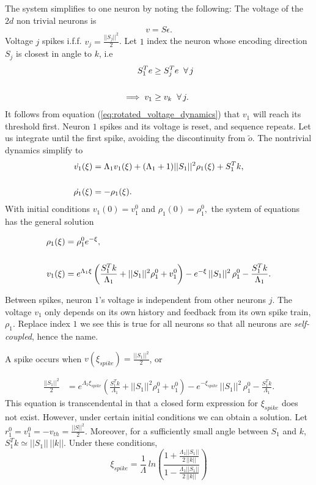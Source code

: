 \begin{enumerate}
The system simplifies to one neuron by noting the following: The voltage of the $2d$ non trivial neurons is 
$$
v = S \epsilon.
$$
Voltage $j$ spikes i.f.f. $v_j = \frac{||S_j||^2}{2}$. Let $1$ index the neuron whose encoding direction $S_j$ is closest in angle to $k$, i.e
\begin{align*}
S_1^T e &\geq S_j^T e \hspace{2mm} \forall \, j
\\
\\
\implies v_1 &\geq v_k \hspace{2mm} \forall \, j.
\end{align*}
It follows from equation (\ref{eq:rotated_voltage_dynamics}) that $v_1$ will reach its threshold first. Neuron $1$ spikes and its voltage is reset, and sequence repeats.
Let us integrate until the first spike, avoiding the discontinuity from $\tilde{o}$. The nontrivial dynamics simplify to 
\begin{align}
\label{eq:simple_voltage_dynamics_constant_driving}
\dot{v_1}(\xi) &= \Lambda_1 v_1(\xi) + (\Lambda_1 + 1)||S_1||^2 \rho_1(\xi) + S_1^T k, \notag
\\
\\ \notag
\dot{\rho_1}(\xi) &= -\rho_1(\xi).
\end{align}
With initial conditions $v_1(0)=v_1^0$ and $\rho_1(0)=\rho_1^0,$ the system of equations has the general solution

\begin{align}
\rho_1(\xi) &= \rho_1^0 e^{-\xi}, \notag
\\
\\ \notag
v_1(\xi) 
&=
e^{\Lambda_1 \xi}  \left(\frac{S_1^T k}{\Lambda_1}+ ||S_1||^2 \rho_1^0 + v_1^0\right) - e^{-\xi} \,||S_1||^2 \, \rho_1^0 - \frac{S_1^T k}{\Lambda_1}.
\end{align}

Between spikes, neuron $1$'s voltage is independent from other neurons $j$. The voltage $v_1$ only depends on its own history and feedback from its own spike train, $\rho_1$. Replace index $1$ we see this is true for all neurons so that all neurons are \textit{self-coupled}, hence the name. 

A spike occurs when $v(\xi_{spike}) = \frac{||S_1||^2}{2}$, or

\begin{align*}
\frac{||S_1||^2}{2} 
&=
e^{\Lambda_1 \xi_{spike}}  \left(\frac{S_1^T k}{\Lambda_1}+ ||S_1||^2 \rho_1^0 + v_1^0\right) - e^{-\xi_{spike}} \,||S_1||^2 \, \rho_1^0 - \frac{S_1^T k}{\Lambda_1}.
\end{align*}
This equation is transcendental in that a closed form expression for $\xi_{spike}$ does not exist. However, under certain initial conditions we can obtain a solution.  Let $r_1^0=v_1^0=-v_{th} = \frac{||S||^2}{2}$. Moreover, for a sufficiently small angle between $S_1$ and $k$, $S_1^T k \simeq ||S_1|| \, ||k||$. Under these conditions, 
$$
\xi_{spike} = \frac{1}{\Lambda} \, ln\left( \frac{1 + \frac{\Lambda_1 ||S_1||}{2 \, ||k||} } { 1  - \frac{\Lambda_1 ||S_1||}{2 \, ||k||}} \right)
$$


\end{enumerate}
